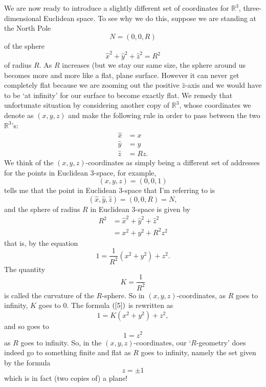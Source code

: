 \documentclass{article}%
\begin{document}
We are now ready to introduce a slightly different set of coordinates for
$\mathbb{R}^{3}$, three-dimensional Euclidean space. To see why we do this,
suppose we are standing at the North Pole%
\[
N=\left(  0,0,R\right)
\]
of the sphere%
\begin{equation}
\hat{x}^{2}+\hat{y}^{2}+\hat{z}^{2}=R^{2} \label{4}%
\end{equation}
of radius $R$. As $R$ increases (but we stay our same size, the sphere around
us becomes more and more like a flat, plane surface. However it can never get
completely flat because we are zooming out the positive $\hat{z}$-axis and we
would have to be `at infinity' for our surface to become exactly flat. We
remedy that unfortunate situation by considering another copy of
$\mathbb{R}^{3}$, whose coordinates we denote as $\left(  x,y,z\right)  $ and
make the following rule in order to pass between the two $\mathbb{R}^{3}$'s:%
\begin{align}
\hat{x}  &  =x\label{105}\\
\hat{y}  &  =y\nonumber\\
\hat{z}  &  =Rz.\nonumber
\end{align}
We think of the $\left(  x,y,z\right)  $-coordinates as simply being a
different set of addresses for the points in Euclidean $3$-space, for example,%
\[
\left(  x,y,z\right)  =\left(  0,0,1\right)
\]
tells me that the point in Euclidean $3$-space that I'm referring to is%
\[
\left(  \hat{x},\hat{y},\hat{z}\right)  =\left(  0,0,R\right)  =N,
\]
and the sphere of radius $R$ in Euclidean $3$-space is given by%
\begin{align*}
R^{2}  &  =\hat{x}^{2}+\hat{y}^{2}+\hat{z}^{2}\\
&  =x^{2}+y^{2}+R^{2}z^{2}%
\end{align*}
that is, by the equation%
\begin{equation}
1=\frac{1}{R^{2}}\left(  x^{2}+y^{2}\right)  +z^{2}. \label{5}%
\end{equation}
The quantity%
\[
K=\frac{1}{R^{2}}%
\]
is called the curvature of the $R$-sphere. So in $\left(  x,y,z\right)
$-coordinates, as $R$ goes to infinity, $K$ goes to $0$. The formula $\left(
\ref{5}\right)  $ is rewritten as%
\begin{equation}
1=K\left(  x^{2}+y^{2}\right)  +z^{2}, \label{7}%
\end{equation}
and so goes to%
\[
1=z^{2}%
\]
as $R$ goes to infinity. So, in the $\left(  x,y,z\right)  $-coordinates, our
`$R$-geometry' does indeed go to something finite and flat as $R$ goes to
infinity, namely the set given by the formula%
\[
z=\pm1
\]
which is in fact (two copies of) a plane!
\end{document}
